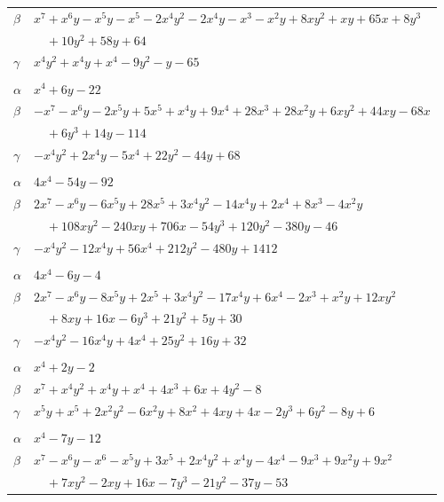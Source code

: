 \documentclass[11pt]{article}
\begin{document}
\begin{longtable}{@{}ll@{}}
$\beta$ & $x^{7}+x^{6}y-x^{5}y-x^{5}-2x^{4}y^{2}-2x^{4}y-x^{3}-x^{2}y+8xy^{2}+xy+65x+8y^{3}$\\
 & $\quad +10y^{2}+58y+64$\\
$\gamma$ & $x^{4}y^{2}+x^{4}y+x^{4}-9y^{2}-y-65$\\
\addlinespace[3pt]
\multicolumn{2}{@{}l}{$\{i,j\}=\{4,39\}$, $k_{ij}=2\cdot 3^{2}\cdot 5$}\\
$\alpha$ & $x^{4}+6y-22$\\
$\beta$ & $-x^{7}-x^{6}y-2x^{5}y+5x^{5}+x^{4}y+9x^{4}+28x^{3}+28x^{2}y+6xy^{2}+44xy-68x$\\
 & $\quad +6y^{3}+14y-114$\\
$\gamma$ & $-x^{4}y^{2}+2x^{4}y-5x^{4}+22y^{2}-44y+68$\\
\addlinespace[3pt]
\multicolumn{2}{@{}l}{$\{i,j\}=\{5,28\}$, $k_{ij}=2^{2}\cdot 3^{6}$}\\
$\alpha$ & $4x^{4}-54y-92$\\
$\beta$ & $2x^{7}-x^{6}y-6x^{5}y+28x^{5}+3x^{4}y^{2}-14x^{4}y+2x^{4}+8x^{3}-4x^{2}y$\\
 & $\quad +108xy^{2}-240xy+706x-54y^{3}+120y^{2}-380y-46$\\
$\gamma$ & $-x^{4}y^{2}-12x^{4}y+56x^{4}+212y^{2}-480y+1412$\\
\addlinespace[3pt]
\multicolumn{2}{@{}l}{$\{i,j\}=\{5,39\}$, $k_{ij}=2^{2}\cdot 3^{2}$}\\
$\alpha$ & $4x^{4}-6y-4$\\
$\beta$ & $2x^{7}-x^{6}y-8x^{5}y+2x^{5}+3x^{4}y^{2}-17x^{4}y+6x^{4}-2x^{3}+x^{2}y+12xy^{2}$\\
 & $\quad +8xy+16x-6y^{3}+21y^{2}+5y+30$\\
$\gamma$ & $-x^{4}y^{2}-16x^{4}y+4x^{4}+25y^{2}+16y+32$\\
\addlinespace[3pt]
\multicolumn{2}{@{}l}{$\{i,j\}=\{6,19\}$, $k_{ij}=2\cdot 5$}\\
$\alpha$ & $x^{4}+2y-2$\\
$\beta$ & $x^{7}+x^{4}y^{2}+x^{4}y+x^{4}+4x^{3}+6x+4y^{2}-8$\\
$\gamma$ & $x^{5}y+x^{5}+2x^{2}y^{2}-6x^{2}y+8x^{2}+4xy+4x-2y^{3}+6y^{2}-8y+6$\\
\addlinespace[3pt]
\multicolumn{2}{@{}l}{$\{i,j\}=\{6,22\}$, $k_{ij}=5\cdot 13$}\\
$\alpha$ & $x^{4}-7y-12$\\
$\beta$ & $x^{7}-x^{6}y-x^{6}-x^{5}y+3x^{5}+2x^{4}y^{2}+x^{4}y-4x^{4}-9x^{3}+9x^{2}y+9x^{2}$\\
 & $\quad +7xy^{2}-2xy+16x-7y^{3}-21y^{2}-37y-53$\\

\end{longtable}
\end{document}
